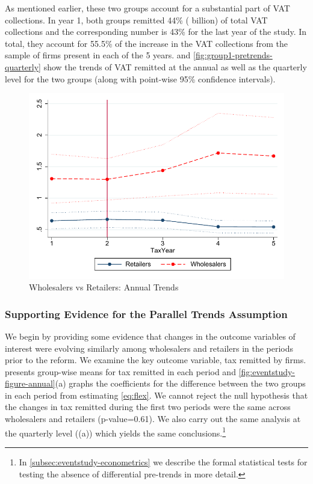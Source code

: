 As mentioned earlier, these two groups account for a substantial part of VAT collections. In year 1, both groups remitted 44\% ( billion) of total VAT collections and the corresponding number is 43\% for the last year of the study. In total, they account for 55.5\% of the increase in the VAT collections from the sample of firms present in each of the 5 years.  and \cref{fig:group1-pretrends-quarterly} show the trends of VAT remitted at the annual as well as the quarterly level for the two groups (along with point-wise 95\% confidence intervals).


\begin{figure}[t] 
\caption{Wholesalers vs Retailers: Annual Trends}
\label{fig:group1-pretrends}
\includegraphics[width=.8\textwidth]{graphs/MeanMoneyDeposited_annual_with_confidenceintervals_Real.pdf}
\end{figure}


\subsubsection{Supporting Evidence for the Parallel Trends Assumption}
\label{subsubsec:evidence-parallel-trends}
We begin by providing some evidence that changes in the outcome variables of interest were evolving similarly among wholesalers and retailers in the periods prior to the reform. We  examine the key outcome variable, tax remitted by firms.  presents group-wise means for tax remitted in each period and \cref{fig:eventstudy-figure-annual}(a) graphs the coefficients for the difference between the two groups in each period from estimating \cref{eq:flex}. We cannot reject the null hypothesis that the changes in tax remitted during the first two periods were the same across wholesalers and retailers (p-value=0.61). We also carry out the same analysis at the quarterly level ((a)) which yields the same conclusions.\footnote{In \cref{subsec:eventstudy-econometrics} we describe the formal statistical tests for testing the absence of differential pre-trends in more detail.} 

